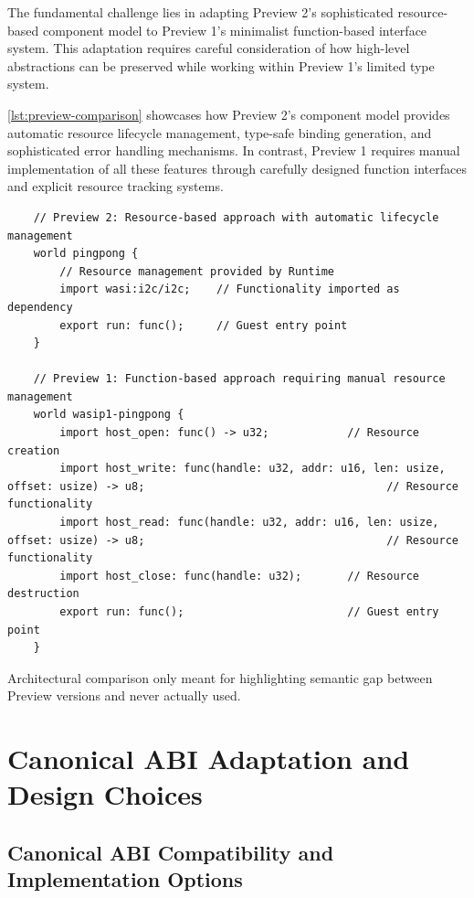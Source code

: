 The fundamental challenge lies in adapting Preview 2's sophisticated resource-based component model to Preview 1's minimalist function-based interface system. This adaptation requires careful consideration of how high-level abstractions can be preserved while working within Preview 1's limited type system.

\autoref{lst:preview-comparison} showcases how Preview 2's component model provides automatic resource lifecycle management, type-safe binding generation, and sophisticated error handling mechanisms. In contrast, Preview 1 requires manual implementation of all these features through carefully designed function interfaces and explicit resource tracking systems.

\begin{listing}[H]
    \begin{verbatim}
    // Preview 2: Resource-based approach with automatic lifecycle management
    world pingpong {
        // Resource management provided by Runtime
        import wasi:i2c/i2c;    // Functionality imported as dependency
        export run: func();     // Guest entry point
    }
    
    // Preview 1: Function-based approach requiring manual resource management
    world wasip1-pingpong {
        import host_open: func() -> u32;            // Resource creation
        import host_write: func(handle: u32, addr: u16, len: usize, offset: usize) -> u8;                                     // Resource functionality
        import host_read: func(handle: u32, addr: u16, len: usize, offset: usize) -> u8;                                     // Resource functionality
        import host_close: func(handle: u32);       // Resource destruction
        export run: func();                         // Guest entry point
    }
    \end{verbatim}
    \caption{Architectural comparison only meant for highlighting semantic gap between Preview versions and never actually used.}
    \label{lst:preview-comparison}
\end{listing}

\section{Canonical ABI Adaptation and Design Choices}
\label{sec:canonical-abi-adaptation}

\subsection{Canonical ABI Compatibility and Implementation Options}

